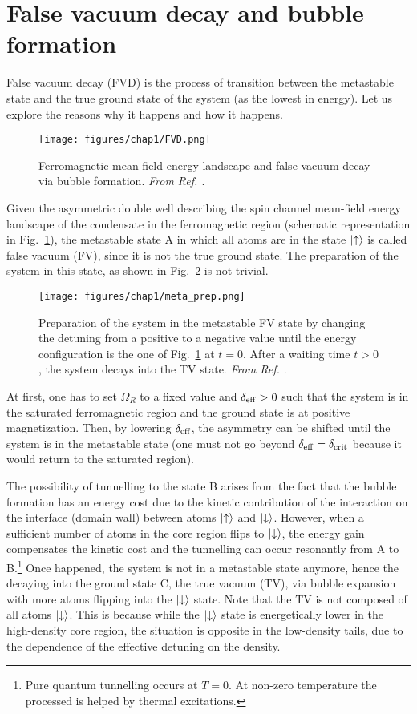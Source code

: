 \section{False vacuum decay and bubble formation}
False vacuum decay (FVD) is the process of transition between the metastable state and the true ground state of the system (as the lowest in energy). Let us explore the reasons why it happens and how it happens.

\begin{figure}[ht!]
    \centering
    \texttt{[image: figures/chap1/FVD.png]}
    \caption{Ferromagnetic mean-field energy landscape and false vacuum decay via bubble formation. \textit{From Ref. \cite{zenesini2024false}}.}
    \label{fig:FVD}
\end{figure}

Given the asymmetric double well describing the spin channel mean-field energy landscape of the condensate in the ferromagnetic region (schematic representation in Fig.\ \ref{fig:FVD}), the metastable state A in which all atoms are in the state $\ket{\uparrow}$ is called false vacuum (FV), since it is not the true ground state. The preparation of the system  in this state, as shown in Fig.\ \ref{fig:meta_prep} is not trivial. 
\begin{figure}[ht!]
    \centering
    \texttt{[image: figures/chap1/meta\_prep.png]}
    \caption{Preparation of the system in the metastable FV state by changing the detuning from a positive to a negative value until the energy configuration is the one of Fig.\ \ref{fig:FVD} at $t = 0$. After a waiting time $t > 0$, the system decays into the TV state. \textit{From Ref. \cite{zenesini2024false}}.}
    \label{fig:meta_prep}
\end{figure}
At first, one has to set $\Omega_R$ to a fixed value and $\delta_{\rm eff} > 0$ such that the system is in the saturated ferromagnetic region and the ground state is at positive magnetization. Then, by lowering $\delta_{\rm eff}$, the asymmetry can be shifted until the system is in the metastable state (one must not go beyond $\delta_{\rm eff} = \delta_{\rm crit}$ because it would return to the saturated region). 

The possibility of tunnelling to the state B arises from the fact that the bubble formation has an energy cost due to the kinetic contribution of the interaction on the interface (domain wall) between atoms $\ket{\uparrow}$ and $\ket{\downarrow}$. However, when a sufficient number of atoms in the core region flips to $\ket{\downarrow}$, the energy gain compensates the kinetic cost and the tunnelling can occur resonantly from A to B.\footnote{Pure quantum tunnelling occurs at $T = 0$. At non-zero temperature the processed is helped by thermal excitations.} Once happened, the system is not in a metastable state anymore, hence the decaying into the ground state C, the true vacuum (TV), via bubble expansion with more atoms flipping into the $\ket{\downarrow}$ state. Note that the TV is not composed of all atoms $\ket{\downarrow}$. This is because while the $\ket{\downarrow}$ state is energetically lower in the high-density core region, the situation is opposite in the low-density tails, due to the dependence of the effective detuning on the density.

